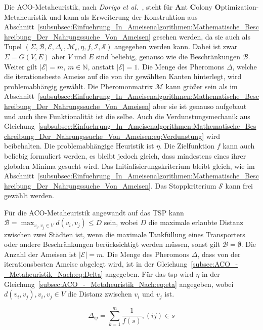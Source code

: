 \documentclass[fontsize=12, a4aper]{scrartcl}
\begin{document}
	Die ACO-Metaheuristik, nach \textit{Dorigo et al.}~\cite{dorigo1996ant}, steht für \textbf{A}nt \textbf{C}olony \textbf{O}ptimization-Metaheuristik und kann als Erweiterung der Konstruktion aus Abschnitt~\ref{subsubsec:Einfuehrung_In_Ameisenalgorithmen:Mathematische_Beschreibung_Der_Nahrungssuche_Von_Ameisen} gesehen werden, da sie auch als Tupel \((\Sigma, \mathcal{B}, \mathcal{E}, \Delta_c, \mathcal{M}_c, \eta, f, \mathcal{I}, \mathcal{S})\) angegeben werden kann. Dabei ist zwar \(\Sigma = G(V,E)\) aber \(V\) und \(E\) sind beliebig, genauso wie die Beschränkungen \(\mathcal{B}\). Weiter gilt \(|\mathcal{E}| = m, \, m \in \mathbb{N}\), anstatt \(|\mathcal{E}| = 1\). Die Menge des Pheromons \(\Delta\), welche die iterationsbeste Ameise auf die von ihr gewählten Kanten hinterlegt, wird problemabhängig gewählt. Die Pheromonmatrix \(\mathcal{M}\) kann größer sein als im Abschnitt~\ref{subsubsec:Einfuehrung_In_Ameisenalgorithmen:Mathematische_Beschreibung_Der_Nahrungssuche_Von_Ameisen} aber sie ist genauso aufgebaut und auch ihre Funktionalität ist die selbe. Auch die Verdunstungsmechanik aus Gleichung~\ref{subsubsec:Einfuehrung_In_Ameisenalgorithmen:Mathematische_Beschreibung_Der_Nahrungssuche_Von_Ameisen:eq:Verdunstung} wird beibehalten. Die problemabhängige Heuristik ist \(\eta\). Die Zielfunktion \(f\) kann auch beliebig formuliert werden, es bleibt jedoch gleich, dass mindestens eines ihrer globalen Minima gesucht wird. Das Initialisierungskriterium bleibt gleich, wie im Abschnitt~\ref{subsubsec:Einfuehrung_In_Ameisenalgorithmen:Mathematische_Beschreibung_Der_Nahrungssuche_Von_Ameisen}. Das Stoppkriterium \(\mathcal{S}\) kann frei gewählt werden.\hfill\newline
	
	Für die ACO-Metaheuristik angewandt auf das TSP kann \(\mathcal{B} = \max_{v_i, v_j \in V} d(v_i, v_j) \leq D\) sein, wobei \(D\) die maximale erlaubte Distanz zwischen zwei Städten ist, wenn die maximale Tankfüllung eines Transporters oder andere Beschränkungen berücksichtigt werden müssen, sonst gilt \(\mathcal{B} = \emptyset\). Die Anzahl der Ameisen ist \(|\mathcal{E}| = m\). Die Menge des Pheromons \(\Delta\), dass von der iterationsbesten Ameise abgelegt wird, ist in der Gleichung~\ref{subsec:ACO_-_Metaheuristik_Nach:eq:Delta} angegeben. Für das \ac{tsp} wird \(\eta\) in der Gleichung~\ref{subsec:ACO_-_Metaheuristik_Nach:eq:eta} angegeben, wobei \(d(v_i, v_j), v_i, v_j \in V\) die Distanz zwischen \(v_i\) und \(v_j\) ist.
	
	\begin{equation} \label{subsec:ACO_-_Metaheuristik_Nach:eq:Delta}
		\Delta_{ij} = \sum \limits_{k = 1}^m \frac{1}{f(s)}, (ij) \in s
	\end{equation}
	
\end{document}
